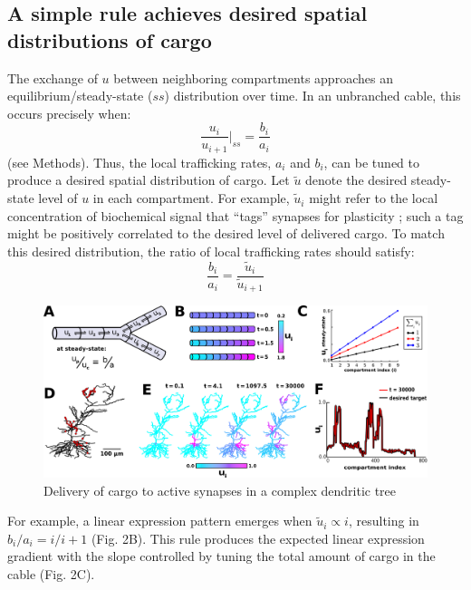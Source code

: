 \documentclass[10pt]{wlpeerj}
\begin{document}
\subsection*{A simple rule achieves desired spatial distributions of cargo}

The exchange of $u$ between neighboring compartments approaches an equilibrium/steady-state ($ss$) distribution over time. In an unbranched cable, this occurs precisely when:
\begin{equation}
\frac{u_i}{u_{i+1}} \Bigg|_{ss} = \frac{b_i}{a_i}
\end{equation}
(see Methods). Thus, the local trafficking rates, $a_i$ and $b_i$, can be tuned to produce a desired spatial distribution of cargo. Let $\tilde{u}$ denote the desired steady-state level of $u$ in each compartment. For example, $\tilde{u}_i$ might refer to the local concentration of biochemical signal that ``tags'' synapses for plasticity \citep{Frey_1997}; such a tag might be positively correlated to the desired level of delivered cargo. To match this desired distribution, the ratio of local trafficking rates should satisfy:
\begin{equation}
\frac{b_i}{a_i} = \frac{\tilde{u}_i}{\tilde{u}_{i+1}}
\end{equation}

\begin{figure}[!htbp]
\begin{center}
\includegraphics[width=0.9\columnwidth]{01_mass_action.png}
\caption{Delivery of cargo to active synapses in a complex dendritic tree}
\end{center}
\end{figure}

For example, a linear expression pattern emerges when $\tilde{u}_i \propto i$, resulting in $b_i / a_i = i / i + 1$ (Fig. 2B).
This rule produces the expected linear expression gradient with the slope controlled by tuning the total amount of cargo in the cable (Fig. 2C).
\end{document}
